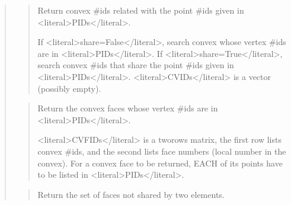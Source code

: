 \documentclass[a4paper,11pt,english]{sphinxmanual}
\begin{document}
\begin{quote}
\sphinxAtStartPar
{}
\begin{quote}

\sphinxAtStartPar
Return convex \#ids related with the point \#ids given in \textless{}literal\textgreater{}PIDs\textless{}/literal\textgreater{}.

\sphinxAtStartPar
If \textless{}literal\textgreater{}share=False\textless{}/literal\textgreater{}, search convex whose vertex \#ids are in \textless{}literal\textgreater{}PIDs\textless{}/literal\textgreater{}.
If \textless{}literal\textgreater{}share=True\textless{}/literal\textgreater{}, search convex \#ids that share the point \#ids
given in \textless{}literal\textgreater{}PIDs\textless{}/literal\textgreater{}. \textless{}literal\textgreater{}CVIDs\textless{}/literal\textgreater{} is a  vector (possibly
empty).
\end{quote}

\sphinxAtStartPar
{}
\begin{quote}

\sphinxAtStartPar
Return the convex faces whose vertex \#ids are in \textless{}literal\textgreater{}PIDs\textless{}/literal\textgreater{}.

\sphinxAtStartPar
\textless{}literal\textgreater{}CVFIDs\textless{}/literal\textgreater{} is a two\sphinxhyphen{}rows matrix, the first row lists convex \#ids,
and the second lists face numbers (local number in the convex).
For a convex face to be returned, EACH of its points have to be
listed in \textless{}literal\textgreater{}PIDs\textless{}/literal\textgreater{}.
\end{quote}

\sphinxAtStartPar
{}
\begin{quote}

\sphinxAtStartPar
Return the set of faces not shared by two elements.


\end{quote}
\end{quote}
\end{document}
